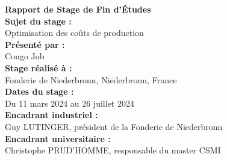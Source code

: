 \documentclass[12pt]{article}
\begin{document}
\begin{titlepage}
    \centering
    
    {\Huge \textbf{Rapport de Stage de Fin d'Études}} \\[1.5cm]
    {\large \textbf{Sujet du stage :}} \\
    {\Large Optimisation des coûts de production} \\[2cm]
    
    {\Large \textbf{Présenté par :}} \\
    {\Large Congo Job} \\[1cm]
    
    {\large \textbf{Stage réalisé à :}} \\
    {\large Fonderie de Niederbronn, Niederbronn, France} \\[0.5cm]

    {\large \textbf{Dates du stage :}} \\
    {\large Du 11 mars 2024 au 26 juillet 2024} \\[1cm]

    {\large \textbf{Encadrant industriel :}} \\
    {\large Guy LUTINGER, président de la Fonderie de Niederbronn} \\[0.5cm]
    

    {\large \textbf{Encadrant universitaire :}} \\
    {\large Christophe PRUD’HOMME, responsable du master CSMI} \\[2cm]
    

\end{titlepage}
\end{document}
